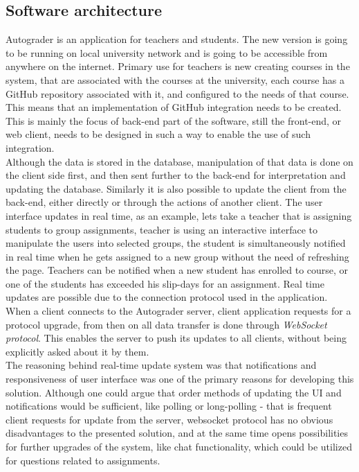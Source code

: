 \subsection{Software architecture}
Autograder is an application for teachers and students. The new version is going to be running on local university network and is going to be accessible from anywhere on the internet. Primary use for teachers is new creating courses in the system, that are associated with the courses at the university, each course has a GitHub repository associated with it, and configured to the needs of that course. This means that an implementation of GitHub integration needs to be created. This is mainly the focus of back-end part of the software, still the front-end, or web client, needs to be designed in such a way to enable the
use of such integration.
\\Although the data is stored in the database, manipulation of that data is done on the client side first, and then sent further to the back-end for interpretation and updating the database. Similarly it is also possible to update the client from the back-end, either directly or through the actions of another client. The user interface updates in real time, as an example, lets take a teacher that is assigning students to group assignments, teacher is using an interactive interface to manipulate the users into selected groups, the student is simultaneously notified in real time when he gets assigned to a new group without the need of refreshing the page. Teachers can be notified when a new student has enrolled to course, or one of the students has exceeded his slip-days for an assignment. Real time updates are possible due to the connection protocol used in the application. When a client connects to the Autograder server, client application requests for a protocol upgrade, from then on all data transfer is done through \emph{WebSocket protocol}\cite{websocket}. This enables the server to push its updates to all clients, without being explicitly asked about it by them.
\\The reasoning behind real-time update system was that notifications and responsiveness of user interface was one of the primary reasons for developing this solution. Although one could argue that order methods of updating the UI and notifications would be sufficient, like polling or long-polling - that is frequent client requests for update from the server, websocket protocol has no obvious disadvantages to the presented solution, and at the same time opens possibilities for further upgrades of the system, like chat functionality, which could be utilized for questions related to assignments.

